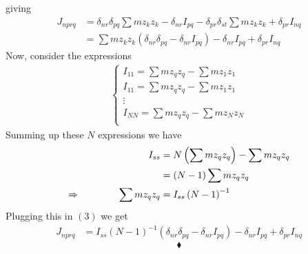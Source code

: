 giving 
\begin{align}
J_{nprq}& =  \delta_{nr} \delta_{pq}\sum m z_k z_k-\delta_{nr}I_{pq} - \delta_{pr} \delta_{st}\sum m z_k z_k+\delta_{pr}I_{nq} \\
&= \sum m z_k z_k\left( \delta_{nr} \delta_{pq}- \delta_{nr}I_{pq}\right)-\delta_{nr}I_{pq} +\delta_{pr}I_{nq}
\end{align}
Now, consider the expressions 
\begin{align}
\left\{\begin{array}{l}
I_{11}= \sum m z_q z_q - \sum m z_1 z_1\\
I_{11}= \sum m z_q z_q - \sum m z_1 z_1\\
\vdots\\
I_{NN} = \sum m z_q z_q - \sum m z_N z_N\\
\end{array}\right.
\end{align}
Summing up these $N$ expressions we have
\begin{align}
I_{ss} &= N\left( \sum m z_q z_q \right) - \sum m z_q z_q\\
&= \left( N-1  \right)\sum m z_q z_q \\
\Rightarrow\quad\quad\quad\quad \sum m z_q z_q &= I_{ss} \left( N-1  \right)^{-1}
\end{align}
Plugging this in $(3)$ we get
\begin{align}
J_{nprq}
&= I_{ss} \left( N-1  \right)^{-1}\left( \delta_{nr} \delta_{pq}- \delta_{nr}I_{pq}\right)-\delta_{nr}I_{pq} +\delta_{pr}I_{nq}
\end{align}
$$\blacklozenge$$
\newpage


